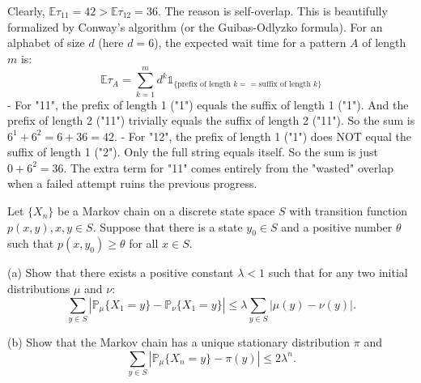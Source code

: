 \begin{solution}
Clearly, $\mathbb{E}\tau_{11} = 42 > \mathbb{E}\tau_{12} = 36$.
The reason is self-overlap. This is beautifully formalized by Conway's algorithm (or the Guibas-Odlyzko formula). For an alphabet of size $d$ (here $d=6$), the expected wait time for a pattern $A$ of length $m$ is:
\[ \mathbb{E}\tau_A = \sum_{k=1}^m d^k \mathbb{1}_{\{\text{prefix of length } k == \text{suffix of length } k\}} \]
- For "11", the prefix of length 1 ("1") equals the suffix of length 1 ("1"). And the prefix of length 2 ("11") trivially equals the suffix of length 2 ("11"). So the sum is $6^1 + 6^2 = 6 + 36 = 42$.
- For "12", the prefix of length 1 ("1") does NOT equal the suffix of length 1 ("2"). Only the full string equals itself. So the sum is just $0 + 6^2 = 36$.
The extra term for "11" comes entirely from the "wasted" overlap when a failed attempt ruins the previous progress.
\end{solution}

\begin{exercise}\label{probability:2021:4}
Let $\{X_n\}$ be a Markov chain on a discrete state space $S$ with transition function $p(x,y), x,y \in S$. Suppose that there is a state $y_0 \in S$ and a positive number $\theta$ such that $p(x,y_0) \geq \theta$ for all $x \in S$.

(a) Show that there exists a positive constant $\lambda < 1$ such that for any two initial distributions $\mu$ and $\nu$:
\[
\sum_{y \in S} |\mathbb{P}_\mu\{X_1 = y\} - \mathbb{P}_\nu\{X_1 = y\}| \leq \lambda \sum_{y \in S}|\mu(y) - \nu(y)|.
\]

(b) Show that the Markov chain has a unique stationary distribution $\pi$ and
\[
\sum_{y \in S} |\mathbb{P}_\mu\{X_n = y\} - \pi(y)| \leq 2\lambda^n.
\]
\end{exercise}

